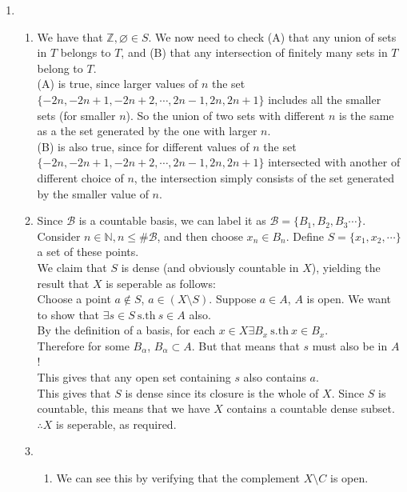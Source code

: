 \documentclass{article}
\let\ddd\cdots
\newcommand{\sth}{\mathrm{s.th}\ }
\newcommand{\N}{\mathbb{N}}
\newcommand{\Z}{\mathbb{Z}}
\renewcommand{\emptyset}{\varnothing}
\newcommand{\ba}{\mathcal{B}}
\theoremstyle{remark}
\theoremstyle{example}
\theoremstyle{examples}
\begin{document}
\begin{enumerate}
\begin{enumerate}
	      \end{enumerate}
	\item \begin{enumerate}
		      \item We have that $\Z, \emptyset \in S$. We now need to check (A) that any union of sets in $T$ belongs to $T$, and (B) that any intersection of finitely many sets in $T$ belong to $T$.\\
		            (A) is true, since larger values of $n$ the set $\{-2n, -2n + 1, -2n + 2, \ddd , 2n - 1, 2n, 2n + 1\}$ includes all the smaller sets (for smaller $n$). So the union of two sets with different $n$ is the same as a the set generated by the one with larger $n$.\\
		            (B) is also true, since for different values of $n$ the set  $\{-2n, -2n + 1, -2n + 2, \ddd , 2n - 1, 2n, 2n + 1\}$ intersected with another of different choice of $n$, the intersection simply consists of the set generated by the smaller value of $n$.
		      \item Since $\ba$ is a countable basis, we can label it as $\ba=\{B_1, B_2,B_3\ddd\}$.\\
		            Consider $n \in \N, n \leq \#\ba$, and then choose $x_n \in B_n$. Define $S=\{x_1,x_2,\ddd\}$ a set of these points.\\
		            We claim that $S$ is dense (and obviously countable in $X$), yielding the result that $X$ is seperable as follows:\\
		            Choose a point $a \notin S$, $a \in (X \setminus S)$. Suppose $a \in A$, $A$ is open. We want to show that $\exists s \in S\ \sth s \in A$ also.\\
		            By the definition of a basis, for each $x \in X \exists B_x \ \sth x \in B_x$.\\
		            Therefore for some $B_\alpha$, $B_\alpha \subset A$. But that means that $s$ must also be in $A$!\\
		            This gives that any open set containing $s$ also contains $a$.\\
		            This gives that $S$ is dense since its closure is the whole of $X$. Since $S$ is countable, this means that we have $X$ contains a countable dense subset.\\
		            $\therefore X$ is seperable, as required.
		      \item \begin{enumerate}
			            \item We can see this by verifying that the complement $X \setminus C$ is open.\\

\end{enumerate}
\end{enumerate}
\end{enumerate}
\end{document}
